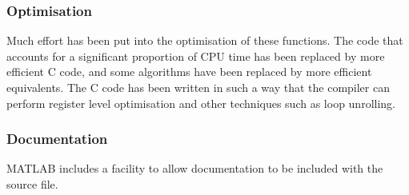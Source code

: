 \subsubsection{Optimisation}

Much effort has been put into the optimisation of these functions.
The code that accounts for a significant proportion of CPU time has
been replaced by more efficient C code, and some algorithms have been
replaced by more efficient equivalents.  The C code has been written
in such a way that the compiler can perform register level
optimisation and other techniques such as loop unrolling.

\subsubsection{Documentation}

MATLAB includes a facility to allow documentation to be included with
the source file.
